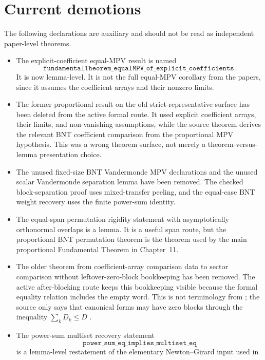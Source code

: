 \documentclass{article}
\begin{document}
\section{Current demotions}

The following declarations are auxiliary and should not be read as independent
paper-level theorems.
\begin{itemize}
  \item The explicit-coefficient equal-MPV result is named
    \[
      \texttt{fundamentalTheorem\_equalMPV\_of\_explicit\_coefficients}.
    \]
    It is now lemma-level. It is not the full equal-MPV corollary from the
    papers, since it assumes the coefficient arrays and their nonzero limits.
  \item The former proportional result on the old strict-representative surface
    has been deleted from the active formal route. It used explicit coefficient
    arrays, their limits, and non-vanishing assumptions, while the source
    theorem derives the relevant BNT coefficient comparison from the
    proportional MPV hypothesis. This was a wrong theorem surface, not merely a
    theorem-versus-lemma presentation choice.
  \item The unused fixed-size BNT Vandermonde MPV declarations and the unused
    scalar Vandermonde separation lemma have been removed. The checked
    block-separation proof uses mixed-transfer peeling, and the equal-case BNT
    weight recovery uses the finite power-sum identity.
  \item The equal-span permutation rigidity statement with asymptotically
    orthonormal overlaps is a lemma. It is a useful span route, but the
    proportional BNT permutation theorem is the theorem used by the main
    proportional Fundamental Theorem in Chapter~11.
  \item The older theorem from coefficient-array comparison data to sector
    comparison without leftover-zero-block bookkeeping has been removed. The
    active after-blocking route keeps this bookkeeping visible because the
    formal equality relation includes the empty word. This is not terminology
    from \cite{Cirac2016MPDO_arXiv}; the source only says that canonical forms
    may have zero blocks through the inequality
    $\sum_k D_k \le D$ \cite[lines~217--219]{Cirac2016MPDO_arXiv}.
  \item The power-sum multiset recovery statement
    \[
      \texttt{power\_sum\_eq\_implies\_multiset\_eq}
    \]
    is a lemma-level restatement of the elementary Newton--Girard input used in

\end{itemize}
\end{document}
